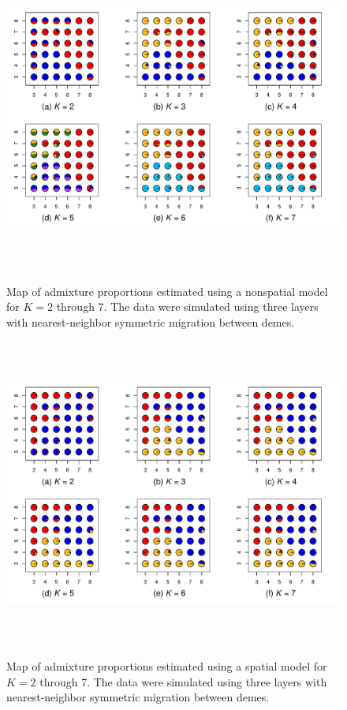 \documentclass[12pt]{article}
\begin{document}
\begin{figure}
	\centering
		{\includegraphics[width=6in,height=4in]{figs/sims/simK3_nsp_pies.pdf}}
	\caption{
	Map of admixture proportions estimated using a nonspatial model for $K=2$ through 7.
	The data were simulated using three layers with nearest-neighbor symmetric migration between demes.
    }\label{simK3_nsp_pies}
\end{figure}

\begin{figure}
	\centering
		{\includegraphics[width=6in,height=4in]{figs/sims/simK3_sp_pies.pdf}}
	\caption{
	Map of admixture proportions estimated using a spatial model for $K=2$ through 7.
	The data were simulated using three layers with nearest-neighbor symmetric migration between demes.
    }\label{simK3_sp_pies}
\end{figure}
\clearpage
\end{document}
